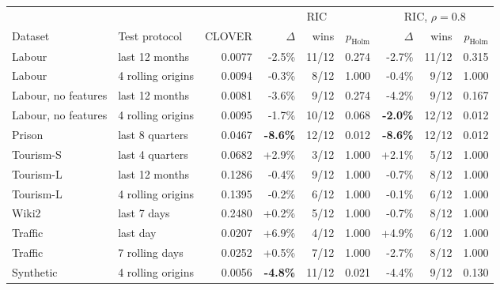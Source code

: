 \begin{tabular}{llrrrrrrr}
\toprule
 & & & \multicolumn{3}{c}{RIC} & \multicolumn{3}{c}{RIC, $\rho{=}0.8$} \\
\cmidrule(lr){4-6} \cmidrule(lr){7-9}
Dataset & Test protocol & CLOVER & $\Delta$ & wins & $p_\text{Holm}$ & $\Delta$ & wins & $p_\text{Holm}$ \\
\midrule
Labour & last 12 months & 0.0077 & -2.5\% & 11/12 & 0.274 & -2.7\% & 11/12 & 0.315 \\
Labour & 4 rolling origins & 0.0094 & -0.3\% & 8/12 & 1.000 & -0.4\% & 9/12 & 1.000 \\
Labour, no features & last 12 months & 0.0081 & -3.6\% & 9/12 & 0.274 & -4.2\% & 9/12 & 0.167 \\
Labour, no features & 4 rolling origins & 0.0095 & -1.7\% & 10/12 & 0.068 & \textbf{-2.0\%} & 12/12 & 0.012 \\
Prison & last 8 quarters & 0.0467 & \textbf{-8.6\%} & 12/12 & 0.012 & \textbf{-8.6\%} & 12/12 & 0.012 \\
Tourism-S & last 4 quarters & 0.0682 & +2.9\% & 3/12 & 1.000 & +2.1\% & 5/12 & 1.000 \\
Tourism-L & last 12 months & 0.1286 & -0.4\% & 9/12 & 1.000 & -0.7\% & 8/12 & 1.000 \\
Tourism-L & 4 rolling origins & 0.1395 & -0.2\% & 6/12 & 1.000 & -0.1\% & 6/12 & 1.000 \\
Wiki2 & last 7 days & 0.2480 & +0.2\% & 5/12 & 1.000 & -0.7\% & 8/12 & 1.000 \\
Traffic & last day & 0.0207 & +6.9\% & 4/12 & 1.000 & +4.9\% & 6/12 & 1.000 \\
Traffic & 7 rolling days & 0.0252 & +0.5\% & 7/12 & 1.000 & -2.7\% & 8/12 & 1.000 \\
Synthetic & 4 rolling origins & 0.0056 & \textbf{-4.8\%} & 11/12 & 0.021 & -4.4\% & 9/12 & 0.130 \\
\bottomrule
\end{tabular}
